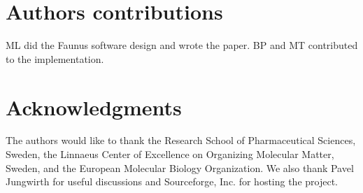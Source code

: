 \documentclass[10pt]{bmc_article}
\newenvironment{bmcformat}{\begin{raggedright}\baselineskip20pt\sloppy\setboolean{publ}{false}}{\end{raggedright}\baselineskip20pt\sloppy}
\begin{document}
\begin{bmcformat}
\section*{Authors contributions}
ML did the Faunus software design and wrote the paper.
BP and MT contributed to the implementation.

\section*{Acknowledgments}
  The authors would like to thank the Research School of Pharmaceutical Sciences, Sweden, the Linnaeus Center of Excellence on Organizing Molecular Matter, Sweden,
and the European Molecular Biology Organization.
We also thank Pavel Jungwirth for useful discussions and Sourceforge, Inc. for hosting the project.


{
   }     %





\end{bmcformat}
\end{document}
